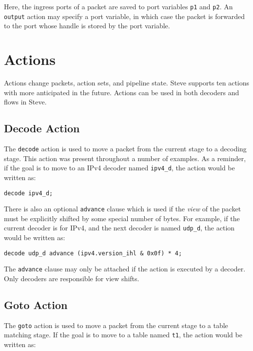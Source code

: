 Here, the ingress ports of a packet are saved to port variables \texttt{p1} and \texttt{p2}. An \texttt{output} action may specify a port variable, in which case the packet is forwarded to the port whose handle is stored by the port variable.

\section{Actions} \label{tut:action}

Actions change packets, action sets, and pipeline state. Steve supports ten
actions with more anticipated in the future. Actions can be used in both
decoders and flows in Steve.

\subsection{Decode Action} \label{tut:decode_action}

The \texttt{decode} action is used to move a packet from the current stage to a
decoding stage. This action was present throughout a number of examples. As a
reminder, if the goal is to move to an IPv4 decoder named \texttt{ipv4\_d}, the
action would be written as:

\begin{lstlisting}
decode ipv4_d;
\end{lstlisting}

There is also an optional \texttt{advance} clause which is used if
the \textit{view} of the packet must be explicitly shifted by some special
number of bytes. For example, if the current decoder is for IPv4, and the next
decoder is named \texttt{udp\_d}, the action would be written as:

\begin{lstlisting}
decode udp_d advance (ipv4.version_ihl & 0x0f) * 4;
\end{lstlisting}

The \texttt{advance} clause may only be attached if the action is executed by a
decoder. Only decoders are responsible for view shifts.

\subsection{Goto Action} \label{tut:goto_action}

The \texttt{goto} action is used to move a packet from the current stage to a
table matching stage. If the goal is to move to a table named \texttt{t1}, the
action would be written as:

